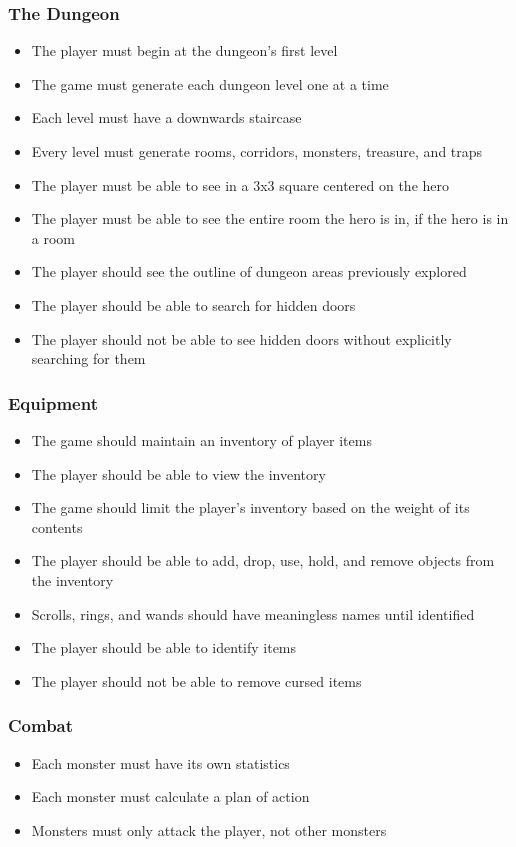 \documentclass[12pt, titlepage]{article}
\begin{document}
		\subsubsection{The Dungeon}
			\begin{itemize}
				\item The player must begin at the dungeon's first level
				\item The game must generate each dungeon level one at a time
				\item Each level must have a downwards staircase
				\item Every level must generate rooms, corridors, monsters, treasure, and traps
				\item The player must be able to see in a 3x3 square centered on the hero
				\item The player must be able to see the entire room the hero is in, if the hero is in a room
				\item The player should see the outline of dungeon areas previously explored
				\item The player should be able to search for hidden doors
				\item The player should not be able to see hidden doors without explicitly searching for them
			\end{itemize}

		\subsubsection{Equipment}
			\begin{itemize}
				\item The game should maintain an inventory of player items
				\item The player should be able to view the inventory
				\item The game should limit the player's inventory based on the weight of its contents
				\item The player should be able to add, drop, use, hold, and remove objects from the inventory
				\item Scrolls, rings, and wands should have meaningless names until identified
				\item The player should be able to identify items
				\item The player should not be able to remove cursed items
			\end{itemize}

		\subsubsection{Combat}
		\begin{itemize}
			\item Each monster must have its own statistics
			\item Each monster must calculate a plan of action
			\item Monsters must only attack the player, not other monsters

		\end{itemize}
\end{document}
